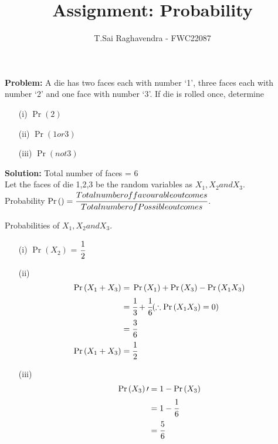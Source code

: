 \documentclass{article}
\providecommand{\pr}[1]{\ensuremath{\Pr\left(#1\right)}}
\newcommand{\Problem}{\noindent \textbf{Problem: }}
\newcommand{\solution}{\noindent \textbf{Solution: }}
\begin{document}
\title{Assignment: Probability}
\author{\Large T.Sai Raghavendra - FWC22087}
\date{}


\maketitle

\Problem A die has two faces each with number ‘1’, three faces each with number ‘2’ and
one face with number ‘3’. If die is rolled once, determine
\begin{enumerate}
\item[(i)] \pr{2}
\item[(ii)] \pr{1 or 3}
\item[(iii)] \pr{not 3}
\end{enumerate}

\solution
Total number of faces = 6\\
Let the faces of die 1,2,3 be the random variables as $X_1,X_2 and X_3$.\\
Probability $\pr{} = \cfrac{Total number of favourable outcomes}{Total number of Possible outcomes}$.

	\begin{table}[h!]
	\small
	\centering
	
	\caption{Probabilities of $X_1,X_2 and X_3$.}
	\label{tables:table1}
	\end{table}

\begin{enumerate}
\item[(i)] \pr{X_2} = $\cfrac{1}{2}$\\  %
	
\item[(ii)] \begin{align}
\pr{X_1 + X_3}	=& \; \pr{X_1} + \pr{X_3} - \pr{X_1X_3}\\
				=& \; \cfrac{1}{3} + \cfrac{1}{6}   (\therefore \pr{X_1X_3} = 0)\\
				=& \; \cfrac{3}{6}\\
\pr{X_1 + X_3} 	=& \; \cfrac{1}{2}
\end{align}

\item[(iii)] \begin{align}
\pr{X_3}\prime =& \; 1 - \pr{X_3}\\
			   =& \; 1 - \cfrac{1}{6}\\
			   =& \; \cfrac{5}{6}
\end{align}
\end{enumerate}
\end{document}

